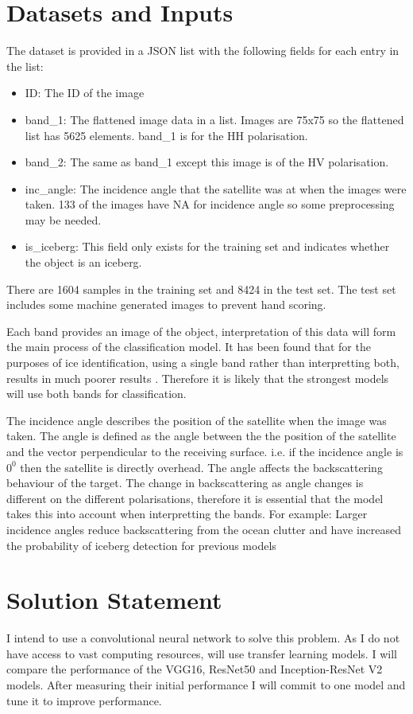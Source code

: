 \documentclass{article}
\begin{document}
\section{Datasets and Inputs}
The dataset is provided in a JSON list with the following fields for each entry in the list:
\begin{itemize}
\item ID: The ID of the image
\item band\_1: The flattened image data in a list. Images are 75x75 so the flattened list has 5625 elements. band\_1 is for the HH polarisation.
\item band\_2: The same as band\_1 except this image is of the HV polarisation.
\item inc\_angle: The incidence angle that the satellite was at when the images were taken. 133 of the images have NA for incidence angle so some preprocessing may be needed.
\item is\_iceberg: This field only exists for the training set and indicates whether the object is an iceberg.
\end{itemize}
There are 1604 samples in the training set and 8424 in the test set. The test set includes some machine generated images to prevent hand scoring. 

Each band provides an image of the object, interpretation of this data will form the main process of the classification model. It has been found that for the purposes of ice identification, using a single band rather than interpretting both, results in much poorer results \cite{radarsat-mode-selection,yu}. Therefore it is likely that the strongest models will use both bands for classification.

The incidence angle describes the position of the satellite when the image was taken. The angle is defined as the angle between the the position of the satellite and the vector perpendicular to the receiving surface. i.e. if the incidence angle is $0^0$ then the satellite is directly overhead. The angle affects the backscattering behaviour of the target. The change in backscattering as angle changes is different on the different polarisations, therefore it is essential that the model takes this into account when interpretting the bands. For example: Larger incidence angles reduce backscattering from the ocean clutter and have increased the probability of iceberg detection for previous models \cite{radarsat-mode-selection}


\section{Solution Statement}
I intend to use a convolutional neural network to solve this problem. As I do not have access to vast computing resources, will use transfer learning models. I will compare the performance of the VGG16, ResNet50 and Inception-ResNet V2 models. After measuring their initial performance I will commit to one model and tune it to improve performance. 
\end{document}
